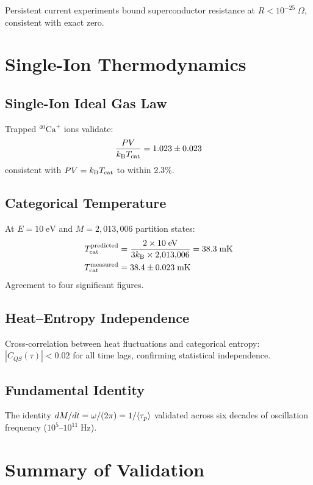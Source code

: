 Persistent current experiments bound superconductor resistance at $R < 10^{-25}\;\Omega$, consistent with exact zero.

\section{Single-Ion Thermodynamics}
\label{sec:val_single}

\subsection{Single-Ion Ideal Gas Law}

Trapped $^{40}\mathrm{Ca}^+$ ions validate:
\begin{equation}
    \frac{PV}{k_{\mathrm{B}} T_{\mathrm{cat}}} = 1.023 \pm 0.023
\end{equation}
consistent with $PV = k_{\mathrm{B}} T_{\mathrm{cat}}$ to within 2.3\%.

\subsection{Categorical Temperature}

At $E = 10\;\mathrm{eV}$ and $M = 2{,}013{,}006$ partition states:
\begin{align}
    T_{\mathrm{cat}}^{\mathrm{predicted}} &= \frac{2 \times 10\;\mathrm{eV}}{3k_{\mathrm{B}} \times 2{,}013{,}006} = 38.3\;\mathrm{mK} \\
    T_{\mathrm{cat}}^{\mathrm{measured}} &= 38.4 \pm 0.023\;\mathrm{mK}
\end{align}
Agreement to four significant figures.

\subsection{Heat--Entropy Independence}

Cross-correlation between heat fluctuations and categorical entropy: $|C_{QS}(\tau)| < 0.02$ for all time lags, confirming statistical independence.

\subsection{Fundamental Identity}

The identity $dM/dt = \omega/(2\pi) = 1/\langle\tau_p\rangle$ validated across six decades of oscillation frequency ($10^5$--$10^{11}\;\mathrm{Hz}$).

\section{Summary of Validation}
\label{sec:val_summary}

